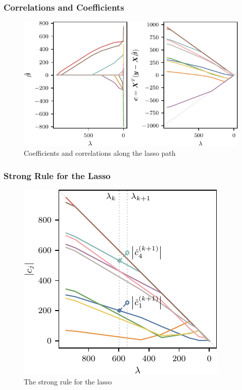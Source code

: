 \documentclass[10pt]{beamer}
\begin{document}
\begin{frame}[c]
  \frametitle{Correlations and Coefficients}
  \begin{figure}[htpb]
    \centering
    \includegraphics[]{figures/paper1-cor-coef-lasso-path.pdf}
    \caption{%
      Coefficients and correlations along the lasso path
    }
  \end{figure}
\end{frame}

\begin{frame}[c]
  \frametitle{Strong Rule for the Lasso}

  \begin{figure}[htpb]
    \centering
    \includegraphics[]{figures/paper1-strong-rule.pdf}
    \caption{%
      The strong rule for the lasso~\parencite{tibshirani2012}
    }
  \end{figure}
\end{frame}
\end{document}
